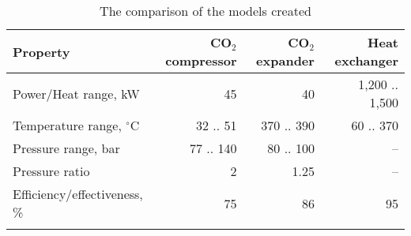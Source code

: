 \begin{table}
\label{tab:DiscussionComparison}
\caption{The comparison of the models created}
\begin{center}
\begin{tabulary}{0.9\textwidth}{LRRR}
\toprule
Property    	                &	CO$_2$ compressor   & CO$_2$	expander    & Heat exchanger    \\
\midrule
Power/Heat range, kW            &       45              &       40              &    1,200 .. 1,500  \\
Temperature range, $^\circ$C    &    32 .. 51           &      370 .. 390       &   60 .. 370       \\
Pressure range, bar             &   77 .. 140           &     80 .. 100         &      --           \\
Pressure ratio                  &   2                   &        1.25           &      --           \\
Efficiency/effectiveness, \%    &      75               &         86            &       95          \\
& & & \\
\bottomrule
\end{tabulary}
\end{center}
\end{table}